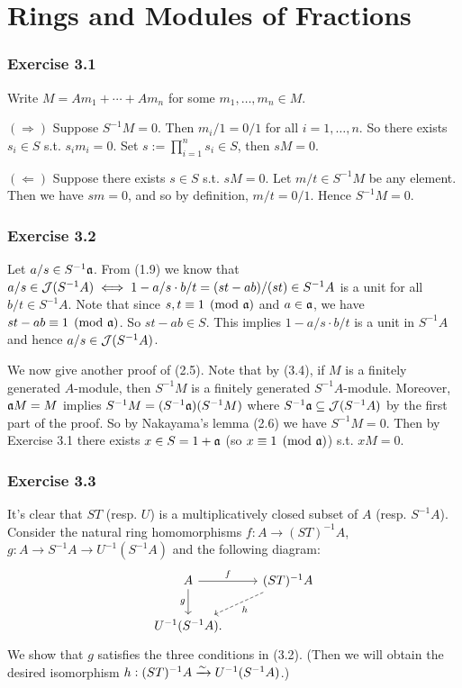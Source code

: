 \documentclass[../A&M.tex]{subfiles}
\begin{document}
\chapter{Rings and Modules of Fractions}

\subsection*{Exercise 3.1}

Write $M = Am_1 + \cdots + Am_n$ for some $m_1,\ldots,m_n \in M$.

$(\Rightarrow)$ Suppose $S^{-1}M = 0$. Then $m_i/1 = 0/1$ for all $i=1,\ldots,n$. So there exists $s_i \in S$ s.t. $s_im_i = 0$. Set $s:=\prod_{i=1}^n s_i \in S$, then $sM=0$.

$(\Leftarrow)$ Suppose there exists $s\in S$ s.t. $sM=0$. Let $m/t \in S^{-1}M$ be any element. Then we have $sm=0$, and so by definition, $m/t = 0/1$. Hence $S^{-1}M=0$.

\subsection*{Exercise 3.2}

Let $a/s \in S^{-1}\mathfrak{a}$. From (1.9) we know that $a/s \in \mathcal{J}(S^{-1}A) \iff 1-a/s \cdot b/t = (st - ab)/(st) \in S^{-1}A$ is a unit for all $b/t \in S^{-1}A$. Note that since $s,t \equiv 1 \pmod{\mathfrak{a}}$ and $a\in\mathfrak{a}$, we have $st - ab \equiv 1 \pmod{\mathfrak{a}}$. So $st - ab \in S$. This implies $1-a/s \cdot b/t$ is a unit in $S^{-1}A$ and hence $a/s \in \mathcal{J}(S^{-1}A)$.

We now give another proof of (2.5). Note that by (3.4), if $M$ is a finitely generated $A$-module, then $S^{-1}M$ is a finitely generated $S^{-1}A$-module. Moreover, $\mathfrak{a} M=M$ implies $S^{-1}M = (S^{-1}\mathfrak{a})(S^{-1}M)$ where $S^{-1}\mathfrak{a} \subseteq \mathcal{J}(S^{-1}A)$ by the first part of the proof. So by Nakayama's lemma (2.6) we have $S^{-1}M=0$. Then by Exercise 3.1 there exists $x\in S = 1 + \mathfrak{a}$ (so $x \equiv 1 \pmod{\mathfrak{a}}$) s.t. $xM=0$.

\subsection*{Exercise 3.3}

It's clear that $ST$ (resp. $U$) is a multiplicatively closed subset of $A$ (resp. $S^{-1}A$). Consider the natural ring homomorphisms $f:A \to (ST)^{-1}A$, $g:A \to S^{-1}A \to U^{-1}(S^{-1}A)$ and the following diagram:
$$
\begin{tikzcd}
  A \arrow[r, "f"] \arrow[d, "g"'] & (ST)^{-1}A \arrow[dl, dashrightarrow, "h"]   \\
  U^{-1}(S^{-1}A).
\end{tikzcd}
$$
We show that $g$ satisfies the three conditions in (3.2). (Then we will obtain the desired isomorphism $h: (ST)^{-1}A \xrightarrow{\sim} U^{-1}(S^{-1}A)$.)
\end{document}
